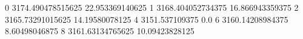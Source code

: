 0 3174.490478515625 22.953369140625
1 3168.404052734375 16.866943359375
2 3165.73291015625 14.19580078125
4 3151.537109375 0.0
6 3160.14208984375 8.60498046875
8 3161.63134765625 10.09423828125
